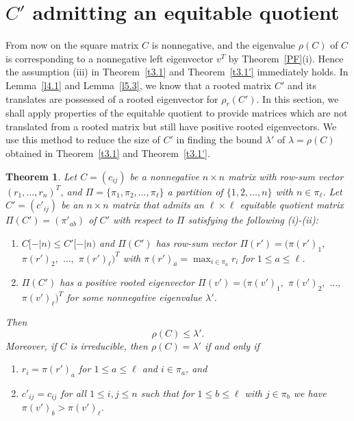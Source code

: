 \documentclass[final,3p, times, 12pt]{elsarticle}
\theoremstyle{plain}
\newtheorem{thm}{Theorem}[section]
\theoremstyle{definition}
\theoremstyle{remark}
\numberwithin{equation}{section}
\begin{document}
\section{$C'$ admitting an equitable quotient}\label{s3.5}

From now on the square matrix $C$ is nonnegative, and the eigenvalue $\rho(C)$ of $C$ is corresponding to a nonnegative left eigenvector $v^T$ by Theorem~\ref{PF}(i). Hence the assumption (iii) in Theorem~\ref{t3.1} and Theorem~\ref{t3.1'} immediately holds. In Lemma~\ref{l4.1} and Lemma~\ref{l5.3}, we know that a rooted matrix $C'$ and its translates are possessed of a rooted eigenvector for $\rho_r(C')$. In this section, we shall apply properties of the equitable quotient to provide matrices which are not translated from a rooted matrix but still have positive rooted eigenvectors.
We use this method to reduce the size of $C'$ in finding the bound $\lambda'$ of $\lambda=\rho(C)$ obtained in Theorem~\ref{t3.1} and Theorem~\ref{t3.1'}.

\begin{thm}\label{t6.1}
Let $C=(c_{ij})$ be a nonnegative $n\times n$ matrix with row-sum vector $(r_1,\ldots,r_n)^T$,  and
 $\Pi=\{\pi_1, \pi_2, \ldots, \pi_\ell\}$ a partition of $\{1, 2, \ldots, n\}$ with $n\in \pi_\ell$.
Let $C'=(c'_{ij})$ be an $n\times n$ matrix that admits
  an $\ell\times \ell$ equitable quotient matrix $\Pi(C')=(\pi'_{ab})$ of $C'$  with respect to $\Pi$ satisfying the following
(i)-(ii):
\begin{enumerate}
\item[(i)] $C[-|n)\leq C'[-|n)$ and
$\Pi(C')$ has row-sum vector  $\Pi(r')=$$(\pi(r')_1,$ $\pi(r')_2,$ $\ldots,$ $\pi(r')_\ell)^T$ with $\pi(r')_a=\max_{i\in \pi_a}r_i$ for $1\leq a\leq \ell$.
\item[(ii)] $\Pi(C')$ has a positive rooted eigenvector $\Pi(v')=$$(\pi(v')_1,$ $\pi(v')_2,$ $\ldots,$ $\pi(v')_\ell)^T$ for some nonnegative eigenvalue $\lambda'$.
\end{enumerate}
Then
\begin{equation}\label{e8.1}
\rho(C)\leq \lambda'.
\end{equation} Moreover, if $C$ is irreducible, then
$\rho(C)= \lambda'$ if and only if
\begin{enumerate}
\item[(a)] $r_i=\pi(r')_a$ \qquad for $1\leq a\leq \ell$ and $i\in \pi_a$, and
\item[(b)]  $c'_{ij}=c_{ij}$ \qquad for all $1\leq i, j\leq n$ such that for $1\leq b\leq \ell$ with $j\in \pi_b$ we have  $\pi(v')_b>\pi(v')_\ell$.
\end{enumerate}
\end{thm}
\end{document}
